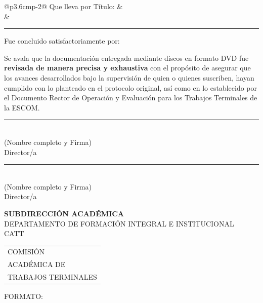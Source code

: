 \begin{titlepage}
    \noindent\begin{tabular}{@{}p{3.6cm}p{\dimexpr\textwidth-3.6cm-2\tabcolsep\relax}@{}}
        Que lleva por Título: & \thetitle\\[-0.6em]
        & \rule{\linewidth}{0.4pt}
    \end{tabular}

    \vspace{1em}

    \noindent Fue concluido satisfactoriamente por:

    \begin{center}
        \authors
    \end{center}

    \noindent Se avala que la documentación entregada mediante discos en formato DVD fue \textbf{revisada de manera precisa y exhaustiva} con el propósito de asegurar que los avances desarrollados bajo la supervisión de quien o quienes suscriben, hayan cumplido con lo planteado en el protocolo original, así como en lo establecido por el Documento Rector de Operación y Evaluación para los Trabajos Terminales de la ESCOM.

    \vspace{2em}


    \vspace{4em}

    \noindent\begin{minipage}[t]{0.45\textwidth}
        \centering
        \rule{\linewidth}{0.4pt}\\
        {\small (Nombre completo y Firma)}\\
        {\small Director/a}
    \end{minipage}\hfill
    \begin{minipage}[t]{0.45\textwidth}
        \centering
        \rule{\linewidth}{0.4pt}\\
        {\small (Nombre completo y Firma)}\\
        {\small Director/a}
    \end{minipage}

    \vfill

    \noindent\begin{minipage}[b]{0.55\textwidth}
        {\scriptsize\bfseries SUBDIRECCIÓN ACADÉMICA}\\
        {\tiny DEPARTAMENTO DE FORMACIÓN INTEGRAL E INSTITUCIONAL}\\[3pt]
        {\Large CATT}\enspace
        {\tiny\begin{tabular}[b]{@{}l@{}}COMISIÓN\\ ACADÉMICA DE\\ TRABAJOS TERMINALES\end{tabular}}
    \end{minipage}\hfill
    \begin{minipage}[b]{0.38\textwidth}
        \raggedleft
        {\tiny FORMATO:}\\
    \end{minipage}
\end{titlepage}
